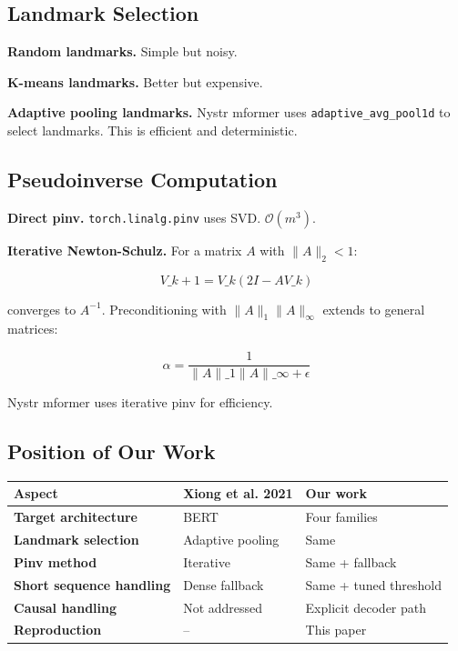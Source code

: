 \subsection{Landmark Selection}

\textbf{Random landmarks.} Simple but noisy.

\textbf{K-means landmarks.} Better but expensive.

\textbf{Adaptive pooling landmarks.} Nystr mformer uses \texttt{adaptive\_avg\_pool1d} 
to select landmarks. This is efficient and deterministic.

\subsection{Pseudoinverse Computation}

\textbf{Direct pinv.} \texttt{torch.linalg.pinv} uses SVD. $\mathcal{O}(m^3)$.

\textbf{Iterative Newton-Schulz.} For a matrix $A$ with $\|A\|_2 < 1$:

\[
V\_{k+1} = V\_k (2I - A V\_k)
\tag{2.2}
\]

converges to $A^{-1}$. Preconditioning with $\|A\|_1 \|A\|_\infty$ 
extends to general matrices:

\[
\alpha = \frac{1}{\|A\|\_1 \|A\|\_\infty + \epsilon}
\tag{2.3}
\]

Nystr mformer uses iterative pinv for efficiency.

\subsection{Position of Our Work}

\begin{table}[H]
\centering
\small
\begin{tabular}{lll}
\toprule
\textbf{Aspect} & \textbf{Xiong et al. 2021} & \textbf{Our work} \\
\midrule
\textbf{Target architecture} & BERT & Four families \\
\textbf{Landmark selection} & Adaptive pooling & Same \\
\textbf{Pinv method} & Iterative & Same + fallback \\
\textbf{Short sequence handling} & Dense fallback & Same + tuned threshold \\
\textbf{Causal handling} & Not addressed & Explicit decoder path \\
\textbf{Reproduction} & -- & This paper \\
\bottomrule
\end{tabular}
\end{table}

